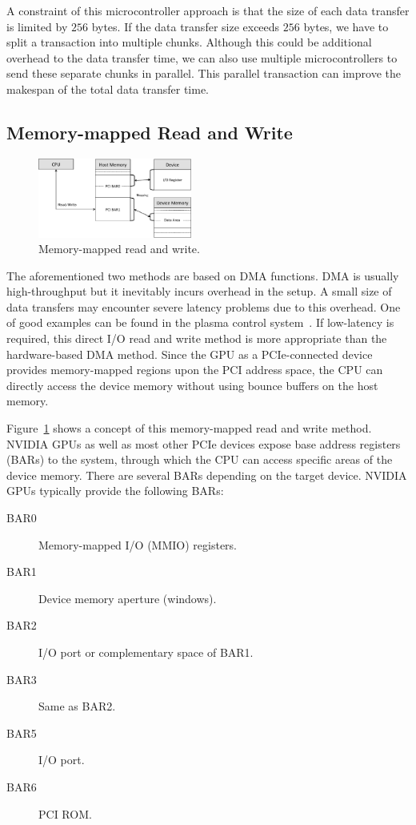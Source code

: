 A constraint of this microcontroller approach is that the size of each
data transfer is limited by $256$ bytes.
If the data transfer size exceeds $256$ bytes, we have to split a
transaction into multiple chunks.
Although this could be additional overhead to the data transfer time, we
can also use multiple microcontrollers to send these separate chunks in
parallel.
This parallel transaction can improve the makespan of the total data
transfer time.

\subsection{Memory-mapped Read and Write}
\label{sec:iorw}

\begin{figure}[!t]
 \centering
 \includegraphics[width=0.45\textwidth]{figure/Method/IORW_Method.pdf}
 \caption{Memory-mapped read and write.}
 \label{fig:iorw}
\end{figure}

The aforementioned two methods are based on DMA functions.
DMA is usually high-throughput but it inevitably incurs overhead in the
setup.
A small size of data transfers may encounter severe latency problems due
to this overhead.
One of good examples can be found in the plasma control
system~\cite{Kato_ICCPS13}.
If low-latency is required, this direct I/O read and write method is
more appropriate than the hardware-based DMA method.
Since the GPU as a PCIe-connected device provides memory-mapped regions
upon the PCI address space, the CPU can directly access the device
memory without using bounce buffers on the host memory.

Figure~\ref{fig:iorw} shows a concept of this memory-mapped read and
write method.
NVIDIA GPUs as well as most other PCIe devices expose base address
registers (BARs) to the system, through which the CPU can access
specific areas of the device memory.
There are several BARs depending on the target device.
NVIDIA GPUs typically provide the following BARs:
\begin{description}
 \item[BAR0] Memory-mapped I/O (MMIO) registers.
 \item[BAR1] Device memory aperture (windows).
 \item[BAR2] I/O port or complementary space of BAR1.
 \item[BAR3] Same as BAR2.
 \item[BAR5] I/O port.
 \item[BAR6] PCI ROM.
\end{description}

